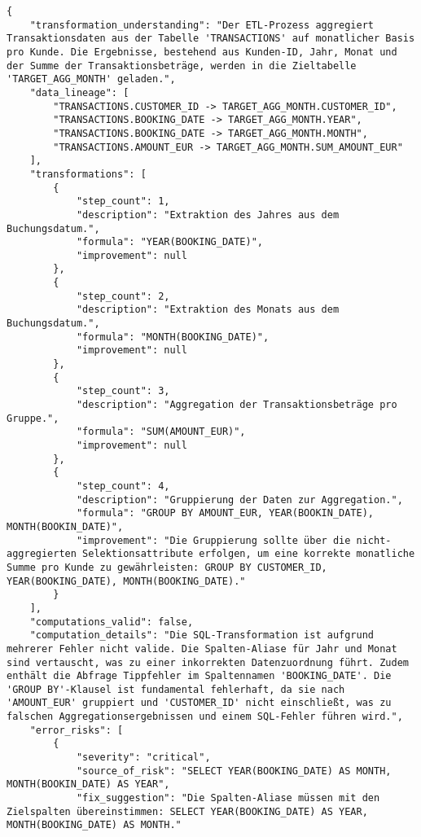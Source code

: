 \begin{lstlisting}[caption={Ausgabe: GEMINI 2.5 Pro Anwendungsfall 1 Konsistenzdurchlauf},label={gemini_case1_prompt2}]
{
    "transformation_understanding": "Der ETL-Prozess aggregiert Transaktionsdaten aus der Tabelle 'TRANSACTIONS' auf monatlicher Basis pro Kunde. Die Ergebnisse, bestehend aus Kunden-ID, Jahr, Monat und der Summe der Transaktionsbeträge, werden in die Zieltabelle 'TARGET_AGG_MONTH' geladen.",
    "data_lineage": [
        "TRANSACTIONS.CUSTOMER_ID -> TARGET_AGG_MONTH.CUSTOMER_ID",
        "TRANSACTIONS.BOOKING_DATE -> TARGET_AGG_MONTH.YEAR",
        "TRANSACTIONS.BOOKING_DATE -> TARGET_AGG_MONTH.MONTH",
        "TRANSACTIONS.AMOUNT_EUR -> TARGET_AGG_MONTH.SUM_AMOUNT_EUR"
    ],
    "transformations": [
        {
            "step_count": 1,
            "description": "Extraktion des Jahres aus dem Buchungsdatum.",
            "formula": "YEAR(BOOKING_DATE)",
            "improvement": null
        },
        {
            "step_count": 2,
            "description": "Extraktion des Monats aus dem Buchungsdatum.",
            "formula": "MONTH(BOOKING_DATE)",
            "improvement": null
        },
        {
            "step_count": 3,
            "description": "Aggregation der Transaktionsbeträge pro Gruppe.",
            "formula": "SUM(AMOUNT_EUR)",
            "improvement": null
        },
        {
            "step_count": 4,
            "description": "Gruppierung der Daten zur Aggregation.",
            "formula": "GROUP BY AMOUNT_EUR, YEAR(BOOKIN_DATE), MONTH(BOOKIN_DATE)",
            "improvement": "Die Gruppierung sollte über die nicht-aggregierten Selektionsattribute erfolgen, um eine korrekte monatliche Summe pro Kunde zu gewährleisten: GROUP BY CUSTOMER_ID, YEAR(BOOKING_DATE), MONTH(BOOKING_DATE)."
        }
    ],
    "computations_valid": false,
    "computation_details": "Die SQL-Transformation ist aufgrund mehrerer Fehler nicht valide. Die Spalten-Aliase für Jahr und Monat sind vertauscht, was zu einer inkorrekten Datenzuordnung führt. Zudem enthält die Abfrage Tippfehler im Spaltennamen 'BOOKING_DATE'. Die 'GROUP BY'-Klausel ist fundamental fehlerhaft, da sie nach 'AMOUNT_EUR' gruppiert und 'CUSTOMER_ID' nicht einschließt, was zu falschen Aggregationsergebnissen und einem SQL-Fehler führen wird.",
    "error_risks": [
        {
            "severity": "critical",
            "source_of_risk": "SELECT YEAR(BOOKING_DATE) AS MONTH, MONTH(BOOKIN_DATE) AS YEAR",
            "fix_suggestion": "Die Spalten-Aliase müssen mit den Zielspalten übereinstimmen: SELECT YEAR(BOOKING_DATE) AS YEAR, MONTH(BOOKING_DATE) AS MONTH."

\end{lstlisting}

